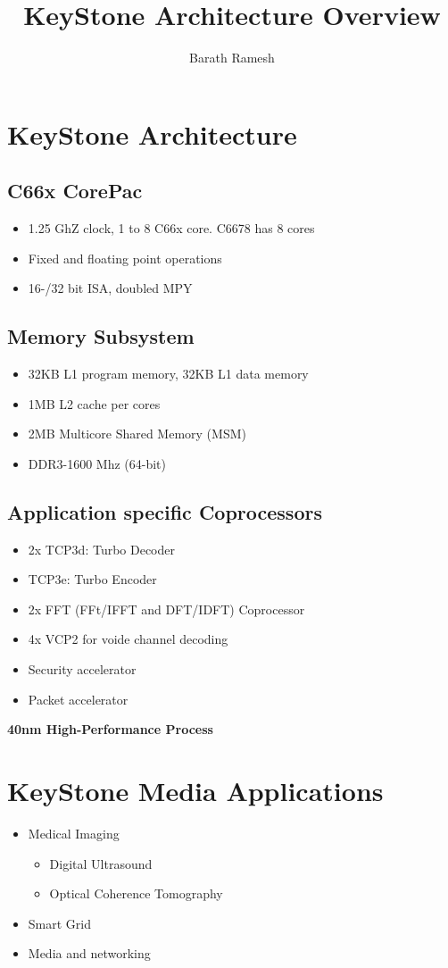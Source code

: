 \documentclass{article}
\author{Barath Ramesh}
\title{KeyStone Architecture Overview}
\begin{document}
\maketitle
\tableofcontents
\newpage
\section{KeyStone Architecture}
\subsection{C66x CorePac}
\begin{itemize}
\item 1.25 GhZ clock, 1 to 8  C66x core. C6678 has 8 cores
\item Fixed and floating point operations
\item 16-/32 bit ISA, doubled MPY
\end{itemize}

\subsection{Memory Subsystem}
\begin{itemize}
\item 32KB L1 program memory, 32KB L1 data memory
\item 1MB L2 cache per cores
\item 2MB Multicore Shared Memory (MSM)
\item DDR3-1600 Mhz (64-bit)
\end{itemize}

\subsection{Application specific Coprocessors}
\begin{itemize}
\item 2x TCP3d: Turbo Decoder
\item TCP3e: Turbo Encoder
\item 2x FFT (FFt/IFFT and DFT/IDFT) Coprocessor
\item 4x VCP2 for voide channel decoding
\item Security accelerator
\item Packet accelerator 
\end{itemize}

\textbf{40nm High-Performance Process}

\section{KeyStone Media Applications}
\begin{itemize}
\item Medical Imaging
\begin{itemize}
\item Digital Ultrasound
\item Optical Coherence Tomography
\end{itemize}
\item Smart Grid
\item Media and networking
\end{itemize}
\end{document}
